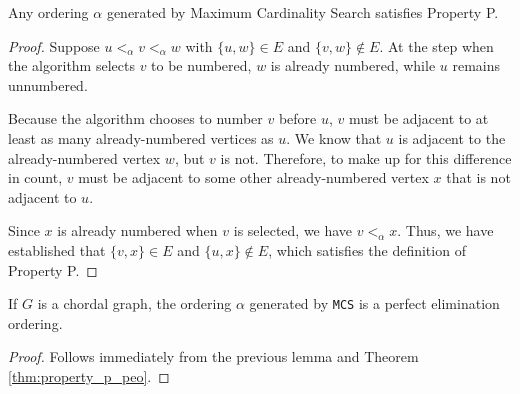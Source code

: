 \begin{lemma}
Any ordering $\alpha$ generated by Maximum Cardinality Search satisfies Property P.
\end{lemma}
\begin{proof}
Suppose $u <_\alpha v <_\alpha w$ with $\{u, w\} \in E$ and $\{v, w\} \notin E$. At the step when the algorithm selects $v$ to be numbered, $w$ is already numbered, while $u$ remains unnumbered.

Because the algorithm chooses to number $v$ before $u$, $v$ must be adjacent to at least as many already-numbered vertices as $u$. We know that $u$ is adjacent to the already-numbered vertex $w$, but $v$ is not. Therefore, to make up for this difference in count, $v$ must be adjacent to some other already-numbered vertex $x$ that is not adjacent to $u$.

Since $x$ is already numbered when $v$ is selected, we have $v <_\alpha x$. Thus, we have established that $\{v, x\} \in E$ and $\{u, x\} \notin E$, which satisfies the definition of Property P.
\end{proof}

\begin{theorem}
If $G$ is a chordal graph, the ordering $\alpha$ generated by \texttt{MCS} is a perfect elimination ordering.
\end{theorem}
\begin{proof}
Follows immediately from the previous lemma and Theorem \ref{thm:property_p_peo}.
\end{proof}

